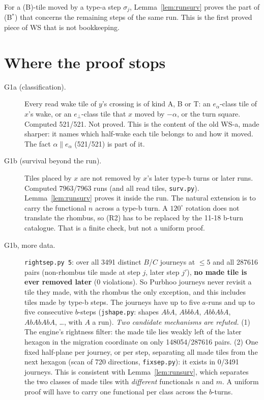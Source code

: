 \documentclass[11pt]{article}
\theoremstyle{definition}\newtheorem{definition}[theorem]{Definition}\newtheorem{remark}[theorem]{Remark}
\begin{document}
\noindent For a (B)-tile moved by a type-a step $\sigma_j$, Lemma~\ref{lem:runsurv} proves the part of (B$^*$) that concerns the remaining steps of the same run. This is the first proved piece of WS that is not bookkeeping.

\section{Where the proof stops}\label{sec:gap}
\begin{description}
\item[G1a (classification).] Every read wake tile of $y$'s crossing is of kind A, B or T: an $e_\alpha$-class tile of $x$'s wake, or an $e_\perp$-class tile that $x$ moved by $-\alpha$, or the turn square. Computed 521/521. Not proved.
This is the content of the old WS-a, made sharper: it names which half-wake each tile belongs to and how it moved. The fact $\alpha\parallel e_\alpha$ (521/521) is part of it.
\item[G1b (survival beyond the run).] Tiles placed by $x$ are not removed by $x$'s later type-b turns or later runs. Computed 7963/7963 runs (and all read tiles, \texttt{surv.py}). Lemma~\ref{lem:runsurv} proves it inside the run.
The natural extension is to carry the functional $n$ across a type-b turn. A $120^\circ$ rotation does not translate the rhombus, so (R2) has to be replaced by the 11-18 b-turn catalogue. That is a finite check, but not a uniform proof.
\item[G1b, more data.] \texttt{rightsep.py 5}: over all 3491 distinct $B$/$C$ journeys at $\le5$ and all 287616 pairs (non-rhombus tile made at step $j$, later step $j'$), \textbf{no made tile is ever removed later} (0 violations). So Purbhoo journeys never revisit a tile they made, with the rhombus the only exception, and this includes tiles made by type-b steps. The journeys have up to five $a$-runs and up to five consecutive $b$-steps (\texttt{jshape.py}: shapes $AbA$, $AbbbA$, $AbbAbA$, $AbAbAbA$, \dots, with $A$ a run).
\emph{Two candidate mechanisms are refuted.} (1) The engine's rightness filter: the made tile lies weakly left of the later hexagon in the migration coordinate on only 148054/287616 pairs. (2) One fixed half-plane per journey, or per step, separating all made tiles from the next hexagon (scan of 720 directions, \texttt{fixsep.py}): it exists in 0/3491 journeys.
This is consistent with Lemma~\ref{lem:runsurv}, which separates the two classes of made tiles with \emph{different} functionals $n$ and $m$. A uniform proof will have to carry one functional per class across the $b$-turns.

\end{description}
\end{document}
